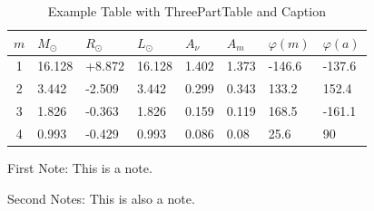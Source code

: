 \begin{table}[htbp]
    \centering
    \begin{threeparttable}
        \caption{Example Table with ThreePartTable and Caption
        \label{tab:example-tabularx}}
        \begin{tabularx}{\textwidth}{cXXXXXXX}
            \toprule
            {$m$} & {$M_\odot$} & {$R_\odot$} & {$L_\odot$} & {$A_\nu$} & {$A_m$} & {$\varphi(m)$} & {$\varphi(a)$} \\ \midrule
            1  & 16.128 & +8.872 & 16.128 & 1.402 & 1.373 & -146.6 & -137.6 \\
            2  & 3.442  & -2.509 & 3.442  & 0.299 & 0.343 & 133.2  & 152.4  \\ \midrule
            3  & 1.826  & -0.363 & 1.826  & 0.159 & 0.119 & 168.5  & -161.1 \\
            4  & 0.993  & -0.429 & 0.993  & 0.086 & 0.08  & 25.6   & 90     \\ \bottomrule
        \end{tabularx}
        \begin{tablenotes}[flushleft]
            \footnotesize
            \item First Note: This is a note.
            \item Second Notes: This is also a note.
        \end{tablenotes}
    \end{threeparttable}
\end{table}